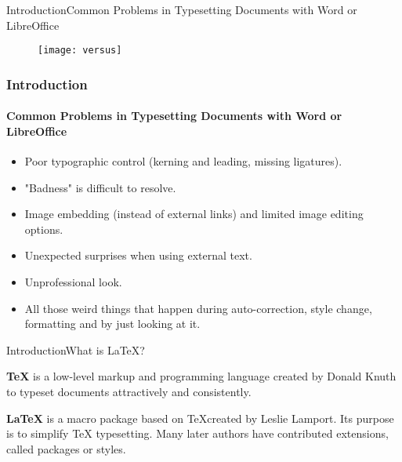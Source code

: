 \documentclass[xcolor={dvipsnames}]{beamer}
\begin{document}
\begin{frame}{Introduction}{Common Problems in Typesetting Documents with Word or LibreOffice}

\begin{figure}[H]
		\texttt{[image: versus]}
\end{figure}

\end{frame}
\begin{frame}
\frametitle{Introduction}\framesubtitle{Common Problems in Typesetting Documents with Word or LibreOffice}

\begin{itemize}
\item Poor typographic control (kerning and leading, missing ligatures).%
\item "Badness" is difficult to resolve.
\item Image embedding (instead of external links) and limited image editing options.%
\item Unexpected surprises when using external text.
\item Unprofessional look.
\item All those weird things that happen during auto-correction, style change, formatting and by just looking at it. %
\end{itemize}


\end{frame}
\begin{frame}{Introduction}{What is {\LaTeX}?}

\textbf{{\TeX}} is a low-level markup and programming language created by Donald Knuth to typeset documents attractively and consistently.

\textbf{{\LaTeX}} is a macro package based on \TeX created by Leslie Lamport. Its purpose is to simplify TeX typesetting. Many later authors have contributed extensions, called packages or styles.
\end{frame}
\end{document}
